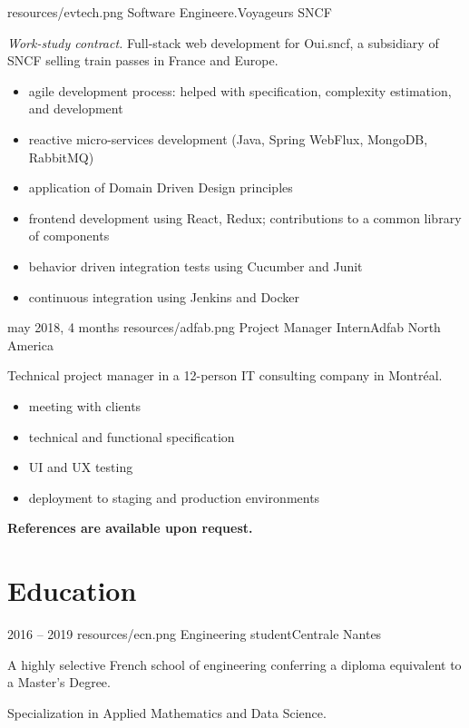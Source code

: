 \documentclass{cv}
\begin{document}
{resources/evtech.png}
{Software Engineer}{e.Voyageurs SNCF}{

\textit{Work-study contract.} Full-stack web development for Oui.sncf, a subsidiary of SNCF selling train passes in France and Europe. 

\begin{itemize}
	\item agile development process: helped with specification, complexity estimation, and development
	\item reactive micro-services development (Java, Spring WebFlux, MongoDB, RabbitMQ)
	\item application of Domain Driven Design principles
	\item frontend development using React, Redux; contributions to a common library of components
	\item behavior driven integration tests using Cucumber and Junit
	\item continuous integration using Jenkins and Docker
\end{itemize}
}

\experience
{{may 2018,  4 months}}
{resources/adfab.png}
{Project Manager Intern}{Adfab North America}{

Technical project manager in a 12-person IT consulting company in Montréal.

\begin{itemize}
	\item meeting with clients
	\item technical and functional specification
	\item UI and UX testing
	\item deployment to staging and production environments
\end{itemize}
}

\begin{center}
	\bfseries References are available upon request.
\end{center}


\pagestyle{withheader}

\section{Education}

\experience
{{2016 -- 2019}}
{resources/ecn.png}
{Engineering student}{Centrale Nantes}{

A highly selective French school of engineering conferring a diploma equivalent to a Master’s Degree. 

Specialization in Applied Mathematics and Data Science.
}	
\end{document}

